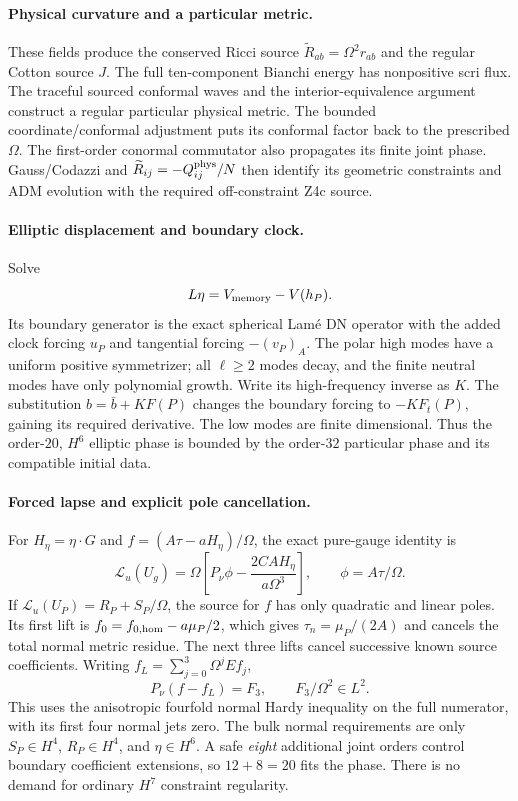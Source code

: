 \paragraph{Physical curvature and a particular metric.}
These fields produce the conserved Ricci source
$\widetilde R_{ab}=\Omega^2r_{ab}$ and the regular Cotton source $J$.
The full ten-component Bianchi energy has nonpositive scri flux.
The traceful sourced conformal waves and the interior-equivalence argument
construct a regular particular physical metric.
The bounded coordinate/conformal adjustment puts its conformal factor
back to the prescribed $\Omega$. The first-order conormal commutator
also propagates its finite joint phase.
Gauss/Codazzi and $\widetilde R_{ij}=-Q^{\rm phys}_{ij}/N$
then identify its geometric constraints and ADM evolution with the
required off-constraint Z4c source.

\paragraph{Elliptic displacement and boundary clock.}
Solve
\[
 L\eta=V_{\rm memory}-V(h_P).
\]
Its boundary generator is the exact spherical Lam\'e DN operator with
the added clock forcing $u_P$ and tangential forcing $-(v_P)_A$.
The polar high modes have a uniform positive symmetrizer; all
$\ell\ge2$ modes decay, and the finite neutral modes have only polynomial
growth. Write its high-frequency inverse as $K$. The substitution
$b=\bar b+KF(P)$ changes the boundary forcing to
$-KF_t(P)$, gaining its required derivative.
The low modes are finite dimensional.
Thus the order-$20$, $H^6$ elliptic phase is bounded by the order-$32$
particular phase and its compatible initial data.

\paragraph{Forced lapse and explicit pole cancellation.}
For $H_\eta=\eta\cdot G$ and
$f=(A\tau-aH_\eta)/\Omega$, the exact pure-gauge identity is
\[
 \mathcal L_u(U_g)
 =\Omega\left[P_\nu\phi-\frac{2CAH_\eta}{a\Omega^3}\right],
 \qquad \phi=A\tau/\Omega.
\]
If $\mathcal L_u(U_P)=R_P+S_P/\Omega$, the source for $f$ has only
quadratic and linear poles. Its first lift is
$f_0=f_{0,\rm hom}-a\mu_P/2$, which gives
$\tau_n=\mu_P/(2A)$ and cancels the total normal metric residue.
The next three lifts cancel successive known source coefficients.
Writing $f_L=\sum_{j=0}^3\Omega^jEf_j$,
\[
 P_\nu(f-f_L)=F_3,\qquad F_3/\Omega^2\in L^2.
\]
This uses the anisotropic fourfold normal Hardy inequality on the full
numerator, with its first four normal jets zero.
The bulk normal requirements are only $S_P\in H^4$, $R_P\in H^4$,
and $\eta\in H^6$. A safe \emph{eight} additional joint orders control
boundary coefficient extensions, so $12+8=20$ fits the phase.
There is no demand for ordinary $H^7$ constraint regularity.

